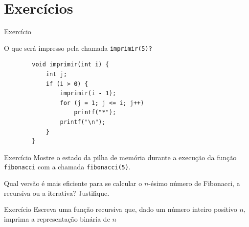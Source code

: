 \documentclass[handout]{beamer}
\newcommand{\cod}[1]{\texttt{#1}}
\begin{document}

\section{Exercícios}

\begin{frame}[fragile]{Exercício}

    O que será impresso pela chamada \cod{imprimir(5)?}
    \begin{verbatim}
        void imprimir(int i) {
            int j;
            if (i > 0) {
                imprimir(i - 1);
                for (j = 1; j <= i; j++)
                    printf("*");
                printf("\n");
            }
        }
    \end{verbatim}
\end{frame}

\begin{frame}[fragile]{Exercício}
    Mostre o estado da pilha de memória durante a execução da função \cod{fibonacci} com a chamada \cod{fibonacci(5)}.

    Qual versão é mais eficiente para se calcular o $n$-ésimo número de Fibonacci, a recursiva ou a iterativa? Justifique.
\end{frame}

\begin{frame}{Exercício}
    Escreva uma função recursiva que, dado um número inteiro positivo $n$, imprima a representação binária de $n$
\end{frame}
\end{document}
